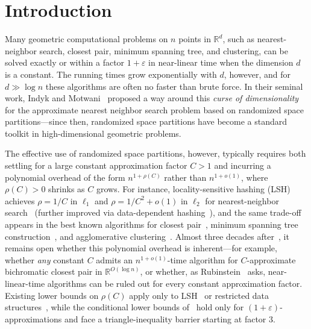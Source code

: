 \documentclass[11pt]{article}
\theoremstyle{definition}
\theoremstyle{remark}
\newcommand{\R}{\mathbb{R}}
\begin{document}
\tableofcontents

\section{Introduction}
\label{sec:intro}

Many geometric computational problems on $n$ points in $\R^d$, such as nearest-neighbor search, closest pair, minimum spanning tree, and clustering, can be solved exactly or within a factor $1 + \varepsilon$ in near-linear time when the dimension $d$ is a constant. The running times grow exponentially with $d$, however, and for $d \gg \log n$ these algorithms are often no faster than brute force. In their seminal work, Indyk and Motwani~\cite{indyk1998approximate} proposed a way around this \emph{curse of dimensionality} for the approximate nearest neighbor search problem based on randomized space partitions---since then, randomized space partitions have become a standard toolkit in high-dimensional geometric problems. 

The effective use of randomized space partitions, however, typically requires both settling for a large constant approximation factor $C > 1$ and incurring a polynomial overhead of the form $n^{1 + \rho(C)}$ rather than $n^{1 + o(1)}$, where $\rho(C) > 0$ shrinks as $C$ grows. For instance, locality-sensitive hashing (LSH) achieves $\rho = 1/C$ in $\ell_1$ and $\rho = 1/C^2 + o(1)$ in $\ell_2$ for nearest-neighbor search~\cite{indyk1998approximate,andoni2008near} (further improved via data-dependent hashing~\cite{andoni2015optimal}), and the same trade-off appears in the best known algorithms for closest pair~\cite{indyk1998approximate,harpeled2012approximate}, minimum spanning tree construction~\cite{harpeled2012approximate,harpeled2013euclidean}, and agglomerative clustering~\cite{borodin1999subquadratic,harpeled2012approximate}. Almost three decades after~\cite{indyk1998approximate}, it remains open whether this polynomial overhead is inherent---for example, whether \emph{any} constant $C$ admits an $n^{1 + o(1)}$-time algorithm for $C$-approximate bichromatic closest pair in $\R^{O(\log n)}$, or whether, as Rubinstein~\cite{rubinstein2018hardness} asks, near-linear-time algorithms can be ruled out for every constant approximation factor. Existing lower bounds on $\rho(C)$ apply only to LSH~\cite{motwani2007lower,odonnell2014optimal} or restricted data structures~\cite{panigrahy2010lower,andoni2017optimal}, while the conditional lower bounds of~\cite{rubinstein2018hardness} hold only for $(1 + \varepsilon)$-approximations and face a triangle-inequality barrier starting at factor $3$.
\end{document}
